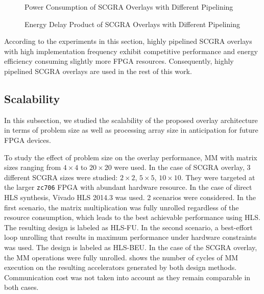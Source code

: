\begin{figure}[htb]
\caption{Power Consumption of SCGRA Overlays with Different Pipelining}
\label{fig:pipeline-power}
\end{figure} 

\begin{figure}[htb]
\centering
{}
\hfill
{}
\caption{Energy Delay Product of SCGRA Overlays with Different Pipelining}
\label{fig:pipeline-edp}
\end{figure}

According to the experiments in this section, highly pipelined SCGRA overlays with high implementation frequency exhibit competitive performance and energy efficiency consuming slightly more FPGA resources. Consequently, highly pipelined SCGRA overlays are used in the rest of this work.
 
\subsection{Scalability}
In this subsection, we studied the scalability of the proposed overlay architecture in terms of problem size as well as processing array size in anticipation for future FPGA devices.

To study the effect of problem size on the overlay performance, MM with matrix sizes ranging from $4\times 4$ to $20 \times 20$ were used. In the case of SCGRA overlay, \num{3} different SCGRA sizes were studied: $2\times 2$, $5\times 5$, $10\times 10$. They were targeted at the larger \texttt{zc706} FPGA with abundant hardware resource. In the case of direct HLS synthesis, Vivado HLS 2014.3 was used. \num{2} scenarios were considered. In the first scenario, the matrix multiplication was fully unrolled regardless of the resource consumption, which leads to the best achievable performance using HLS. The resulting design is labeled as HLS-FU. In the second scenario, a best-effort loop unrolling that results in maximum performance under hardware constraints was used. The design is labeled as HLS-BEU. In the case of the SCGRA overlay, the MM operations were fully unrolled.  shows the number of cycles of MM execution on the resulting accelerators generated by both design methods. Communication cost was not taken into account as they remain comparable in both cases.

